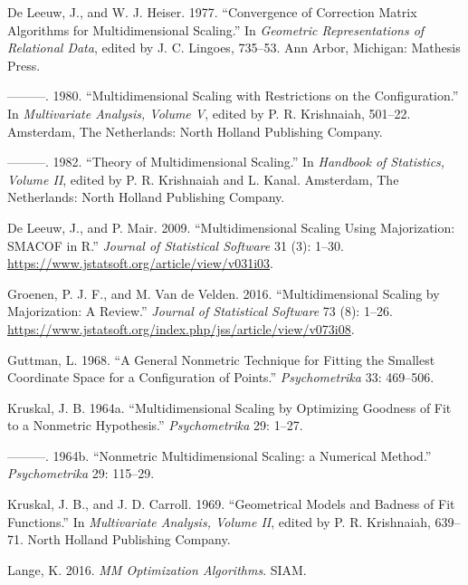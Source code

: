 \documentclass[
  12pt,
  letterpaper,
  DIV=11,
  numbers=noendperiod]{scrartcl}
\newlength{\cslhangindent}
\newenvironment{CSLReferences}[2] %
 {\begin{list}{}{%
  \setlength{\itemindent}{0pt}
  \setlength{\leftmargin}{0pt}
  \setlength{\parsep}{0pt}
  \ifodd #1
   \setlength{\leftmargin}{\cslhangindent}
   \setlength{\itemindent}{-1\cslhangindent}
  \fi
  \setlength{\itemsep}{#2\baselineskip}}}
 {\end{list}}
\theoremstyle{plain}
\theoremstyle{remark}
\begin{document}
\begin{CSLReferences}{1}{0}
De Leeuw, J., and W. J. Heiser. 1977. {``Convergence of Correction
Matrix Algorithms for Multidimensional Scaling.''} In \emph{Geometric
Representations of Relational Data}, edited by J. C. Lingoes, 735--53.
Ann Arbor, Michigan: Mathesis Press.

---------. 1980. {``Multidimensional Scaling with Restrictions on the
Configuration.''} In \emph{Multivariate Analysis, Volume {V}}, edited by
P. R. Krishnaiah, 501--22. Amsterdam, The Netherlands: North Holland
Publishing Company.

---------. 1982. {``Theory of Multidimensional Scaling.''} In
\emph{Handbook of Statistics, Volume {II}}, edited by P. R. Krishnaiah
and L. Kanal. Amsterdam, The Netherlands: North Holland Publishing
Company.

De Leeuw, J., and P. Mair. 2009. {``{Multidimensional Scaling Using
Majorization: SMACOF in R}.''} \emph{Journal of Statistical Software} 31
(3): 1--30. \url{https://www.jstatsoft.org/article/view/v031i03}.

Groenen, P. J. F., and M. Van de Velden. 2016. {``{Multidimensional
Scaling by Majorization: A Review}.''} \emph{Journal of Statistical
Software} 73 (8): 1--26.
\url{https://www.jstatsoft.org/index.php/jss/article/view/v073i08}.

Guttman, L. 1968. {``{A General Nonmetric Technique for Fitting the
Smallest Coordinate Space for a Configuration of Points}.''}
\emph{Psychometrika} 33: 469--506.

Kruskal, J. B. 1964a. {``{Multidimensional Scaling by Optimizing
Goodness of Fit to a Nonmetric Hypothesis}.''} \emph{Psychometrika} 29:
1--27.

---------. 1964b. {``{Nonmetric Multidimensional Scaling: a Numerical
Method}.''} \emph{Psychometrika} 29: 115--29.

Kruskal, J. B., and J. D. Carroll. 1969. {``{Geometrical Models and
Badness of Fit Functions}.''} In \emph{Multivariate Analysis, Volume
II}, edited by P. R. Krishnaiah, 639--71. North Holland Publishing
Company.

Lange, K. 2016. \emph{MM Optimization Algorithms}. SIAM.


\end{CSLReferences}
\end{document}

